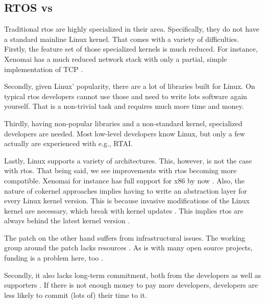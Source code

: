 \documentclass[10pt,twocolumn,a4paper]{article}
\begin{document}
\subsection{RTOS vs }
Traditional \acrshort{rtos} are highly specialized in their area.
Specifically, they do not have a standard mainline Linux kernel.
That comes with a variety of difficulties.
Firstly, the feature set of those specialized kernels is much reduced.
For instance, Xenomai has a much reduced network stack with only a partial, simple implementation of TCP \cite{xenomai_network_2024}.

Secondly, given Linux' popularity, there are a lot of libraries built for Linux.
On typical \acrshort{rtos} developers cannot use those and need to write lots software again yourself.
That is a non-trivial task and requires much more time and money.

Thirdly, having non-popular libraries and a non-standard kernel, specialized developers are needed.
Most low-level developers know Linux, but only a few actually are experienced with e.g., RTAI.

Lastly, Linux supports a variety of architectures.
This, however, is not the case with \acrshort{rtos}.
That being said, we see improvements with \acrshort{rtos} becoming more compatible.
Xenomai for instance has full support for x86 by now \cite{xenomai_supported}.
Also, the nature of cokernel approaches implies having to write an abstraction layer for every Linux kernel version.
This is because invasive modifications of the Linux kernel are necessary, which break with kernel updates \cite{reghenzani_realtime_2019}.
This implies \acrshort{rtos} are always behind the latest kernel version \cite{xenomai_versions}.
\newline

\noindent The  patch on the other hand suffers from infrastructural issues.
The working group around the patch lacks resources \cite{perlow_trenches_2021}.
As is with many open source projects, funding is a problem here, too \cite{perlow_trenches_2021}.

Secondly, it also lacks long-term commitment, both from the developers as well as supporters \cite{perlow_trenches_2021}.
If there is not enough money to pay more developers, developers are less likely to commit (lots of) their time to it.
\end{document}

